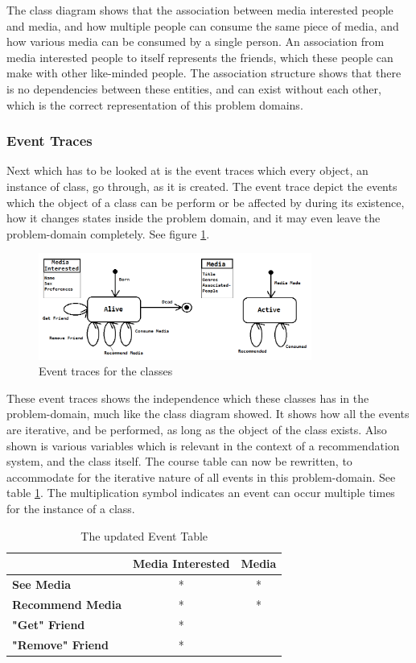 The class diagram shows that the association between media interested people and media, and how multiple people can consume the same piece of media, and how various media can be consumed by a single person. An association from media interested people to itself represents the friends, which these people can make with other like-minded people. The association structure shows that there is no dependencies between these entities, and can exist without each other, which is the correct representation of this problem domains.

\subsubsection{Event Traces}

Next which has to be looked at is the event traces which every object, an instance of class, go through, as it is created. The event trace depict the events which the object of a class can be perform or be affected by during its existence, how it changes states inside the problem domain, and it may even leave the problem-domain completely. See figure \ref{Courses}.

\begin{figure}[htb]
\centering
\includegraphics[width=0.8\textwidth]{Images/courses.png}
\caption{Event traces for the classes}
\label{Courses}
\end{figure}

These event traces shows the independence which these classes has in the problem-domain, much like the class diagram showed. It shows how all the events are iterative, and be performed, as long as the object of the class exists. Also shown is various variables which is relevant in the context of a recommendation system, and the class itself. The course table can now be rewritten, to accommodate for the iterative nature of all events in this problem-domain. See table \ref{UpdatedEventTable}. The multiplication symbol indicates an event can occur multiple times for the instance of a class.

\begin{table}[htb]
\centering
\begin{tabular}{|l|c|c|} \hline
	  & \textbf{Media Interested} & \textbf{Media} \\ \hline
	\textbf{See Media} & * & * \\ \hline
	\textbf{Recommend Media} & * & * \\ \hline
	\textbf{"Get" Friend} & * &  \\ \hline
	\textbf{"Remove" Friend} & * &  \\ \hline
\end{tabular}
\caption{The updated Event Table}
\label{UpdatedEventTable}
\end{table}
